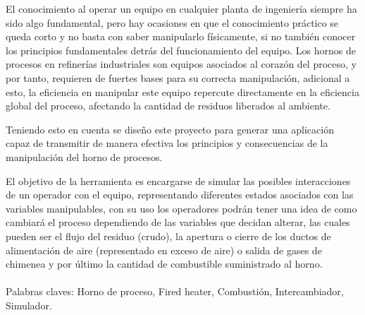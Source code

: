 \documentclass[pregrado]{tesis-usb}
\begin{document}
\frontmatter
\maketitle


\begin{resumen}
     El conocimiento al operar un equipo en cualquier planta de ingeniería siempre ha sido algo fundamental, pero hay ocasiones en que el conocimiento práctico se queda corto y no basta con saber manipularlo físicamente, si no también conocer los principios fundamentales detrás del funcionamiento del equipo. Los hornos de procesos en refinerías industriales son equipos asociados al corazón del proceso, y por tanto, requieren de fuertes bases para su correcta manipulación, adicional a esto, la eficiencia en manipular este equipo repercute directamente en la eficiencia global del proceso, afectando la cantidad de residuos liberados al ambiente.
     
     Teniendo esto en cuenta se diseño este proyecto para generar una aplicación capaz de transmitir de manera efectiva los principios y consecuencias de la manipulación del horno de procesos. 
     
     El objetivo de la herramienta es encargarse de simular las posibles interacciones de un operador con el equipo, representando diferentes estados asociados con las variables manipulables, con su uso los operadores podrán tener una idea de como cambiará el proceso dependiendo de las variables que decidan alterar, las cuales pueden ser el flujo del residuo (crudo), la apertura o cierre de los ductos de alimentación de aire (representado en exceso de aire) o salida de gases de chimenea y por último la cantidad de combustible suministrado al horno.\\
     \vspace{15pt}\\
     Palabras claves: Horno de proceso, Fired heater, Combustión, Intercambiador, Simulador.
\end{resumen}
\tableofcontents
\listoffigures
\useacronyms
%

\mainmatter




%
%

\nocite{*}

\appendix


\end{document}
